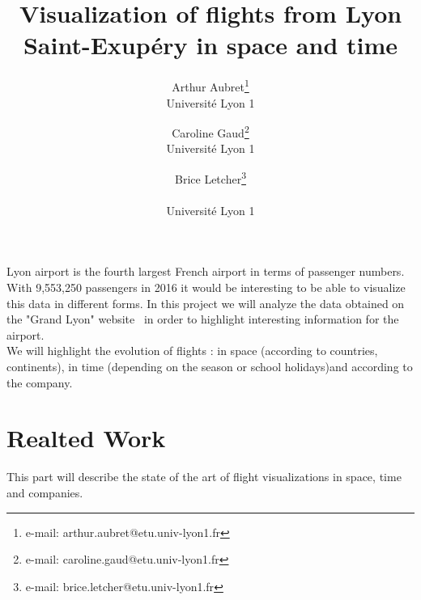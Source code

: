 \documentclass{vgtc}
\title{Visualization of flights from Lyon Saint-Exupéry in space and time}
\author{Arthur Aubret\thanks{e-mail: arthur.aubret@etu.univ-lyon1.fr}\\ 
        \scriptsize Université Lyon 1
\and Caroline Gaud\thanks{e-mail: caroline.gaud@etu.univ-lyon1.fr}\\
     \scriptsize Université Lyon 1
\and Brice Letcher\thanks{e-mail: brice.letcher@etu.univ-lyon1.fr}\\ 
     \parbox{1.4in}{\scriptsize \centering Université Lyon 1}}
\begin{document}
\maketitle

Lyon airport is the fourth largest French airport in terms of passenger numbers. With 9,553,250 passengers in 2016 it would be interesting to be able to visualize this data in different forms.
In this project we will analyze the data obtained on the  "Grand Lyon" website~\cite{GrandLyon} in order to highlight interesting information for the airport. \\
We will highlight the evolution of flights : in space (according to countries, continents), in time (depending on the season or school holidays)and according to the company.


\section{Realted Work}

This part will describe the state of the art of flight visualizations in space, time and companies. \\


%

%
%
%


\end{document}
